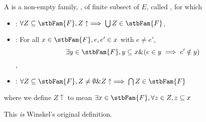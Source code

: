 \begin{definition}
A  is a non-empty family, , of finite
subsect of $E$, called , for which
\begin{itemize}
  \item {}: $\forall Z \subseteq \stbFam{F}, Z
    \uparrow \implies \bigcup Z \in \stbFam{F}$,
  \item {} : For all $x \in
    \stbFam{F}, e, e' \in x$ with $e \ne e'$, 
    $$ \exists y \in \stbFam{F}, y \subseteq x \& (e \in y \implies e' \notin y)$$,
  \item {} : $\forall Z \subseteq \stbFam{F}, Z \ne
    \emptyset \& Z \uparrow \implies \bigcap Z \in \stbFam{F}$
\end{itemize}
where we define $Z \uparrow$ to mean $\exists x \in \stbFam{F}, \forall z \in Z, z \subseteq x$ 
\end{definition}

This \emph{is} Winskel's original definition.